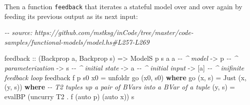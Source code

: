 \documentclass[]{article}
\newenvironment{Shaded}{}{}
\newcommand{\CommentTok}[1]{\textcolor[rgb]{0.38,0.63,0.69}{\textit{#1}}}
\newcommand{\DataTypeTok}[1]{\textcolor[rgb]{0.56,0.13,0.00}{#1}}
\newcommand{\FunctionTok}[1]{\textcolor[rgb]{0.02,0.16,0.49}{#1}}
\newcommand{\KeywordTok}[1]{\textcolor[rgb]{0.00,0.44,0.13}{\textbf{#1}}}
\newcommand{\NormalTok}[1]{#1}
\newcommand{\OperatorTok}[1]{\textcolor[rgb]{0.40,0.40,0.40}{#1}}
\newcommand{\OtherTok}[1]{\textcolor[rgb]{0.00,0.44,0.13}{#1}}
\begin{document}
\begin{Shaded}
\end{Shaded}

Then a function \texttt{feedback} that iterates a stateful model over and over
again by feeding its previous output as its next input:

\begin{Shaded}
\begin{Highlighting}[]
\CommentTok{{-}{-} source: https://github.com/mstksg/inCode/tree/master/code{-}samples/functional{-}models/model.hs\#L257{-}L269}

\NormalTok{feedback}
\OtherTok{    ::}\NormalTok{ (}\DataTypeTok{Backprop}\NormalTok{ a, }\DataTypeTok{Backprop}\NormalTok{ s)}
    \OtherTok{=\textgreater{}} \DataTypeTok{ModelS}\NormalTok{ p s a a     }\CommentTok{{-}{-} \^{} model}
    \OtherTok{{-}\textgreater{}}\NormalTok{ p                  }\CommentTok{{-}{-} \^{} parameterization}
    \OtherTok{{-}\textgreater{}}\NormalTok{ s                  }\CommentTok{{-}{-} \^{} initial state}
    \OtherTok{{-}\textgreater{}}\NormalTok{ a                  }\CommentTok{{-}{-} \^{} initial input}
    \OtherTok{{-}\textgreater{}}\NormalTok{ [a]                }\CommentTok{{-}{-} \^{} inifinite feedback loop}
\NormalTok{feedback f p s0 x0 }\OtherTok{=}\NormalTok{ unfoldr go (x0, s0)}
  \KeywordTok{where}
\NormalTok{    go (x, s) }\OtherTok{=} \DataTypeTok{Just}\NormalTok{ (x, (y, s\textquotesingle{}))}
      \KeywordTok{where}
        \CommentTok{{-}{-} \textquotesingle{}T2\textquotesingle{} tuples up a pair of \textquotesingle{}BVar\textquotesingle{}s into a \textquotesingle{}BVar\textquotesingle{} of a tuple}
\NormalTok{        (y, s\textquotesingle{}) }\OtherTok{=}\NormalTok{ evalBP (}\FunctionTok{uncurry} \DataTypeTok{T2} \OperatorTok{.}\NormalTok{ f (auto p) (auto x)) s}
\end{Highlighting}
\end{Shaded}
\end{document}
